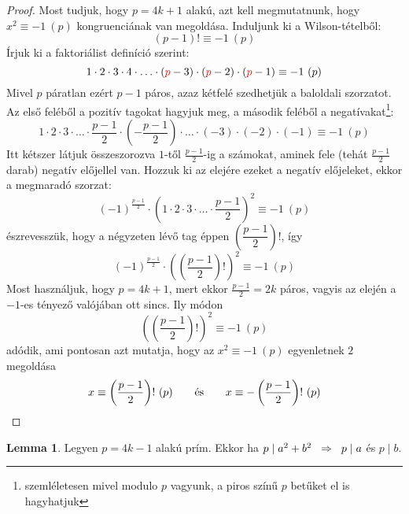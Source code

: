 \documentclass[12pt]{book}
\theoremstyle{plain} %
\theoremstyle{definition} %
\newtheorem{lem/}{Lemma}[section]
\newenvironment{lem}
  {\renewcommand{\qedsymbol}{$\clubsuit$}%
   \pushQED{\qed}\begin{lem/}}
  {\popQED\end{lem/}}
\theoremstyle{remark}
\renewcommand\qedsymbol{$\blacksquare$}
\numberwithin{equation}{section}  %
\begin{document}
\begin{proof}
		Most tudjuk, hogy $p=4k+1$ alakú, azt kell megmutatnunk, hogy $x^2\equiv -1\ (p)$ kongruenciának van megoldása. Induljunk ki a Wilson-tételből:
		\[ (p-1)! \equiv -1\ (p)  \]
		Írjuk ki a faktoriálist definíció szerint:
		\[ 1\cdot 2\cdot 3 \cdot 4\cdot \ldots \cdot (\color{red}p\color{black}-3)\cdot (\color{red}p\color{black}-2) \cdot (\color{red}p\color{black}-1) \equiv -1\ (p)  \]
		Mivel $p$ páratlan ezért $p-1$ páros, azaz kétfelé szedhetjük a baloldali szorzatot. Az első feléből a pozitív tagokat hagyjuk meg, a második feléből a negatívakat\footnote{szemléletesen mivel modulo $p$ vagyunk, a piros színű $p$ betűket el is hagyhatjuk}:
		\[ 1\cdot 2\cdot 3\cdot \ldots \cdot \dfrac{p-1}{2} \cdot \left(-\dfrac{p-1}{2}\right) \cdot \ldots \cdot (-3) \cdot (-2) \cdot (-1) \equiv -1\ (p) \]
		Itt kétszer látjuk összeszorozva $1$-től $\frac{p-1}{2}$-ig a számokat, aminek fele (tehát $\frac{p-1}{2}$ darab) negatív előjellel van. Hozzuk ki az elejére ezeket a negatív előjeleket, ekkor a megmaradó szorzat:
		\[ (-1)^{\frac{p-1}{2}} \cdot \left( 1\cdot 2\cdot 3\cdot \ldots \cdot \dfrac{p-1}{2}\right)^2 \equiv -1\ (p) \]
		észrevesszük, hogy a négyzeten lévő tag éppen $\left(\dfrac{p-1}{2}\right)!$, így
		\[ (-1)^{\frac{p-1}{2}} \cdot \left( \left(\frac{p-1}{2} \right) !  \right)^2  \equiv -1\ (p) \]
		Most használjuk, hogy $p=4k+1$, mert ekkor $\frac{p-1}{2}=2k$ páros, vagyis az elején a $-1$-es tényező valójában ott sincs. Ily módon
		\[ \left( \left(\frac{p-1}{2} \right) !  \right)^2  \equiv -1\ (p)   \]
		adódik, ami pontosan azt mutatja, hogy az $x^2\equiv -1\ (p)$ egyenletnek $2$ megoldása
		\[ x\equiv \left( \dfrac{p-1}{2} \right)!\ (p) \hspace{7mm} \text{és} \hspace{7mm} x\equiv - \left(\dfrac{p-1}{2}\right)!\ (p)  \]
	\end{proof}

	\begin{lem}\label{2nszlem}
		Legyen $p=4k-1$ alakú prím. Ekkor ha $p\mid a^2+b^2 \hspace{2mm} \Rightarrow \hspace{2mm} p\mid a$ és $p\mid b$.
	\end{lem}
\end{document}
